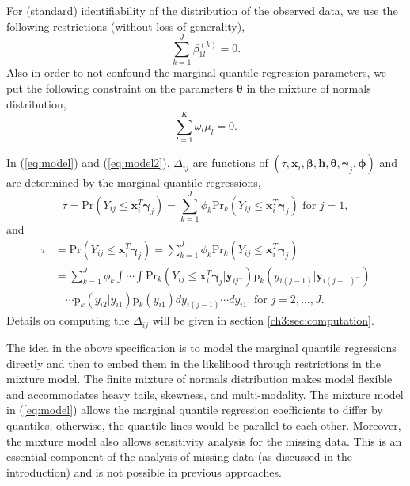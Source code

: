\documentclass[12pt]{article}
\newcommand{\pr}{\mbox{p}}
\newcommand{\prob}{\mbox{Pr}}
\begin{document}
For (standard) identifiability of the distribution of the observed data, we use the
following restrictions (without loss of generality),
\begin{displaymath}
 \sum_{k=1}^J \beta_{1l}^{(k)} = 0.
\end{displaymath}
Also in order to not confound the marginal quantile regression parameters,
we put the following constraint on the parameters $\bm \theta$ in the mixture of normals distribution,
\begin{displaymath}
\sum_{l= 1}^K \omega_{l}\mu_{l} = 0.
\end{displaymath}

In (\ref{eq:model}) and (\ref{eq:model2}), $\Delta_{ij}$ are functions of $(\tau, \bm x_{i},
\bm \beta, \bm h, \bm \theta, \bm \gamma_j, \bm \phi)$ and are determined by the marginal
quantile regressions,
\begin{equation}
  \label{eq:deltaeqn1}
  \tau = \prob (Y_{ij} \leq \bm x_{i}^T \bm \gamma_j ) = \sum_{k=1}^J
  \phi_k\prob_k (Y_{ij} \leq \bm x_{i}^T \bm \gamma_j ) \mbox{  for  } j = 1,
\end{equation}
and
\begin{align}\label{eq:deltaeqn2}
  \tau &= \prob (Y_{ij} \leq \bm x_{i}^{T} \bm \gamma_j ) =
  \sum_{k=1}^J
  \phi_k\prob_k (Y_{ij} \leq \bm x_{i}^{T} \bm \gamma_j ) \\
  & = \sum_{k=1}^J \phi_k \int\cdots \int \prob_k (Y_{ij} \leq \bm
  x_{i}^{T} \bm \gamma_j | \bm y_{ij^{-}}
  ) \pr_k (y_{i(j-1)}| \bm y_{i(j-1)^{-}})  \nonumber \\
  & \quad \cdots \pr_k (y_{i2}| y_{i1}) \pr_k(y_{i1})
  dy_{i(j-1)}\cdots dy_{i1}.  \mbox{  for  } j = 2, \ldots, J .\nonumber
\end{align}
Details on computing the $\Delta_{ij}$ will be given in section
\ref{ch3:sec:computation}.

The idea in the above specification is to model the marginal quantile regressions directly and then to embed them in the likelihood through restrictions in the mixture model.
The finite mixture of normals distribution makes model flexible and accommodates heavy tails, skewness, and multi-modality.
The mixture model in (\ref{eq:model}) allows the marginal quantile regression coefficients to differ by quantiles; otherwise, the quantile lines would be parallel to each other.
Moreover, the mixture model also allows sensitivity analysis for the missing data.
This is an essential component of the analysis of missing data (as discussed in the introduction) and is not possible in previous approaches.
\end{document}
